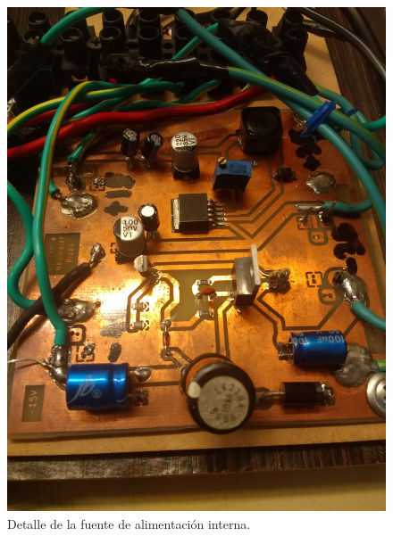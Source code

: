 \begin{figure}[H]
    \centering
    \includegraphics[height=0.7 \textwidth, angle=90]{img/fotos/4.jpg}
    \caption{Detalle de la fuente de alimentación interna.}
    \label{fig:prototype4}
\end{figure}